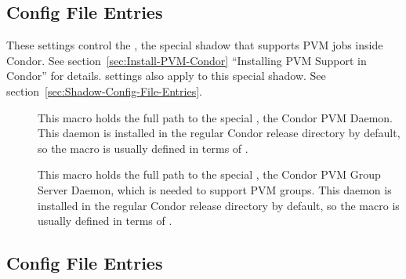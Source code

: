 \subsection{\label{sec:Shadow-PVM-Config-File-Entries}
 Config File Entries}

These settings control the , the special shadow
that supports PVM jobs inside Condor.  See
section~\ref{sec:Install-PVM-Condor} ``Installing PVM Support in
Condor'' for details.   settings also apply to this
special shadow.  See section~\ref{sec:Shadow-Config-File-Entries}.
\begin{description}

\item[] \label{param:PvmD}  This macro holds the full path
  to the special , the Condor PVM Daemon.  This daemon is
  installed in the regular Condor release directory by default, so the
  macro is usually defined in terms of .
  
\item[] \label{param:PvmGS} This macro holds the full
  path to the special , the Condor PVM Group Server
  Daemon, which is needed to support PVM groups.  This daemon is
  installed in the regular Condor release directory by default, so the
  macro is usually defined in terms of .

\end{description}

\subsection{\label{sec:Starter-Config-File-Entries}
 Config File Entries}


